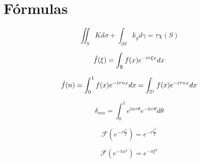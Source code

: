 \cleardoublepage


\section*{Fórmulas}
\newcommand{\ii}{\mathrm{i}}

\begin{equation*}
\iint_S K d\sigma + \int_{\partial S} k_g d\gamma = \tau\chi(S)
\end{equation*}

\begin{equation*}
\hat f(\xi) = \int_{\R} f(x)e^{- \ii \tau \xi x} dx
\end{equation*}

\begin{equation*}
\hat f(n) = \int_0^1 f(x) e^{- \ii \tau n x} dx = \int_{\S^1} f(x) e^{- \ii \tau n x} dx
\end{equation*}


\begin{equation*}
\delta_{mn} = \int_0^1 e^{\ii m\tau \theta}e^{-\ii n \tau \theta}d\theta
\end{equation*}

\begin{equation*}
\mathcal{F}(e^{-\tau \frac{x^2}{2}}) = e^{-\tau \frac{\xi^2}{2}}
\end{equation*}

\begin{equation*}
\mathcal{F}(e^{-\pi x^2}) = e^{-\pi \xi^2}
\end{equation*}









